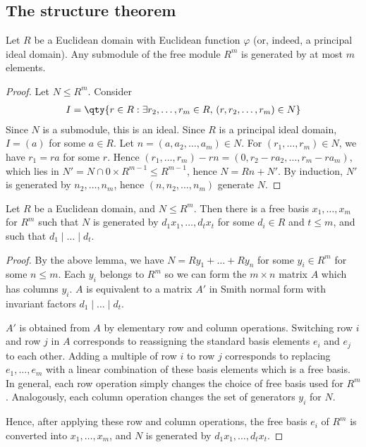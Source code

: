 \subsection{The structure theorem}
\begin{lemma}
	Let $R$ be a Euclidean domain with Euclidean function $\varphi$ (or, indeed, a principal ideal domain).
	Any submodule of the free module $R^m$ is generated by at most $m$ elements.
\end{lemma}
\begin{proof}
	Let $N \leq R^m$.
	Consider
	\begin{align*}
		I = \qty{r \in R : \exists r_2, \dots, r_m \in R,\, (r,r_2, \dots, r_m) \in N}
	\end{align*}
	Since $N$ is a submodule, this is an ideal.
	Since $R$ is a principal ideal domain, $I = (a)$ for some $a \in R$.
	Let $n = (a, a_2, \dots, a_m) \in N$.
	For $(r_1, \dots, r_m) \in N$, we have $r_1 = ra$ for some $r$.
	Hence $(r_1, \dots, r_m) - rn = (0,r_2 - ra_2, \dots, r_m - ra_m)$, which lies in $N' = N \cap \qty{0} \times R^{m-1} \leq R^{m-1}$, hence $N = Rn + N'$.
	By induction, $N'$ is generated by $n_2, \dots, n_m$, hence $(n, n_2, \dots, n_m)$ generate $N$.
\end{proof}
\begin{theorem}
	Let $R$ be a Euclidean domain, and $N \leq R^m$.
	Then there is a free basis $x_1, \dots, x_m$ for $R^m$ such that $N$ is generated by $d_1 x_1, \dots, d_t x_t$ for some $d_i \in R$ and $t \leq m$, and such that $d_1 \mid \dots \mid d_t$.
\end{theorem}
\begin{proof}
	By the above lemma, we have $N = R y_1 + \dots + R y_n$ for some $y_i \in R^m$ for some $n \leq m$.
	Each $y_i$ belongs to $R^m$ so we can form the $m \times n$ matrix $A$ which has columns $y_i$.
	$A$ is equivalent to a matrix $A'$ in Smith normal form with invariant factors $d_1 \mid \dots \mid d_t$.

	$A'$ is obtained from $A$ by elementary row and column operations.
	Switching row $i$ and row $j$ in $A$ corresponds to reassigning the standard basis elements $e_i$ and $e_j$ to each other.
	Adding a multiple of row $i$ to row $j$ corresponds to replacing $e_1, \dots, e_m$ with a linear combination of these basis elements which is a free basis.
	In general, each row operation simply changes the choice of free basis used for $R^m$.
	Analogously, each column operation changes the set of generators $y_i$ for $N$.

	Hence, after applying these row and column operations, the free basis $e_i$ of $R^m$ is converted into $x_1, \dots, x_m$, and $N$ is generated by $d_1 x_1, \dots, d_t x_t$.
\end{proof}
